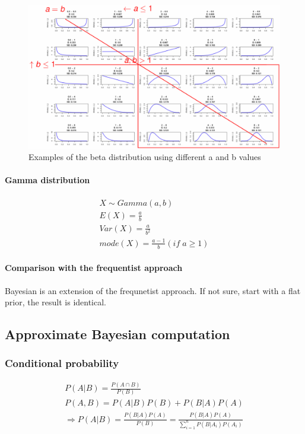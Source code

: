\begin{figure}[H]
	\centering
	\includegraphics[width=\textwidth]{images/beta-examples.png}
	\caption{Examples of the beta distribution using different a and b values}
\end{figure}

\paragraph{Gamma distribution}
\begin{gather*}
X\sim Gamma(a, b)\\
E(X) = \frac{a}{b}\\
Var(X) = \frac{a}{b^2}\\
mode(X) = \frac{a-1}{b} (if \; a \geq 1)
\end{gather*}

\paragraph{Comparison with the frequentist approach}
Bayesian is an extension of the frequnetist approach. If not sure, start with a flat prior, the result is identical.

\subsection{Approximate Bayesian computation}
\subsubsection{Conditional probability}
\begin{gather*}
P(A|B) = \frac{P(A\cap B)}{P(B)}\\
P(A,B) = P(A|B)P(B) + P(B|A)P(A)\\
\Rightarrow P(A|B) = \frac{P(B|A)P(A)}{P(B)} = \frac{P(B|A)P(A)}{\sum_{i=1}^{n}P(B|A_i)P(A_i)}
\end{gather*}

